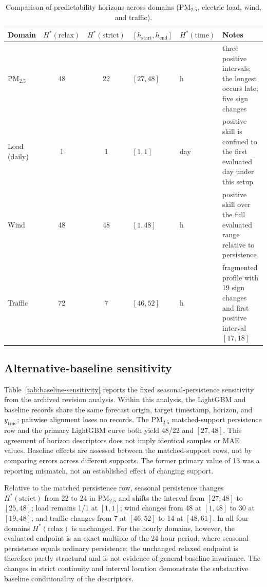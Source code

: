 \documentclass[pdflatex]{sn-jnl}
\begin{document}
\begin{table}[h]
\centering
\small
\setlength{\tabcolsep}{4pt}
\renewcommand{\arraystretch}{1.1}
\begin{tabularx}{\linewidth}{@{}l c c >{\centering\arraybackslash}p{1.8cm} >{\centering\arraybackslash}p{1.4cm} >{\raggedright\arraybackslash}X@{}}
\toprule
Domain & $H^*(\mathrm{relax})$ & $H^*(\mathrm{strict})$ & $[h_{\mathrm{start}}, h_{\mathrm{end}}]$ & $H^*(\mathrm{time})$ & Notes \\
\midrule
PM$_{2.5}$ & 48 & 22 & $[27,48]$ & 22 h & three positive intervals; the longest occurs late; five sign changes \\
Load (daily) & 1 & 1 & $[1,1]$ & 1 day & positive skill is confined to the first evaluated day under this setup \\
Wind & 48 & 48 & $[1,48]$ & 48 h & positive skill over the full evaluated range relative to persistence \\
Traffic & 72 & 7 & $[46,52]$ & 7 h & fragmented profile with 19 sign changes and first positive interval $[17,18]$ \\
\bottomrule
\end{tabularx}
\caption{Comparison of predictability horizons across domains (PM$_{2.5}$, electric load, wind, and traffic).}
\label{tab:results}
\end{table}

\subsection{Alternative-baseline sensitivity}
Table~\ref{tab:baseline-sensitivity} reports the fixed seasonal-persistence
sensitivity from the archived revision analysis. Within this analysis,
the LightGBM and baseline records share the same forecast origin, target
timestamp, horizon, and $y_{\mathrm{true}}$; pairwise alignment loses no
records. The PM$_{2.5}$ matched-support persistence row and the primary
LightGBM curve both yield 48/22 and $[27,48]$. This agreement of horizon
descriptors does not imply identical samples or MAE values. Baseline
effects are assessed between the matched-support rows, not by comparing
errors across different supports. The former primary value of 13 was a
reporting mismatch, not an established effect of changing support.

Relative to the matched persistence row, seasonal persistence changes
$H^*(\mathrm{strict})$ from 22 to 24 in PM$_{2.5}$ and shifts the interval
from $[27,48]$ to $[25,48]$; load remains 1/1 at $[1,1]$; wind changes from
48 at $[1,48]$ to 30 at $[19,48]$; and traffic changes from 7 at $[46,52]$
to 14 at $[48,61]$. In all four domains $H^*(\mathrm{relax})$ is unchanged.
For the hourly domains, however, the evaluated endpoint is an exact multiple
of the 24-hour period, where seasonal persistence equals ordinary persistence;
the unchanged relaxed endpoint is therefore partly structural and is not
evidence of general baseline invariance. The changes in strict continuity and
interval location demonstrate the substantive baseline conditionality of the
descriptors.
\end{document}
